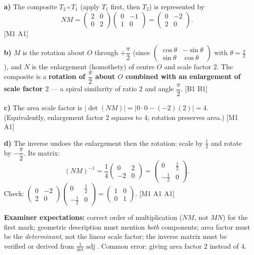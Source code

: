 \documentclass[11pt]{article}
\begin{document}
\begin{corrige}
\textbf{a)} The composite $T_2 \circ T_1$ (apply $T_1$ first, then $T_2$) is represented by
\[ NM = \begin{pmatrix} 2 & 0 \\ 0 & 2 \end{pmatrix}\begin{pmatrix} 0 & -1 \\ 1 & 0 \end{pmatrix} = \begin{pmatrix} 0 & -2 \\ 2 & 0 \end{pmatrix}. \]
\hfill [M1 A1]

\textbf{b)} $M$ is the rotation about $O$ through $+\dfrac{\pi}{2}$ (since $\begin{pmatrix}\cos\theta & -\sin\theta \\ \sin\theta & \cos\theta\end{pmatrix}$ with $\theta = \frac{\pi}{2}$), and $N$ is the enlargement (homothety) of centre $O$ and scale factor $2$. The composite is a \textbf{rotation of $\dfrac{\pi}{2}$ about $O$ combined with an enlargement of scale factor $2$} — a spiral similarity of ratio $2$ and angle $\dfrac{\pi}{2}$. \hfill [B1 B1]

\textbf{c)} The area scale factor is $|\det(NM)| = |0\cdot 0 - (-2)(2)| = 4$. (Equivalently, enlargement factor $2$ squares to $4$; rotation preserves area.) \hfill [M1 A1]

\textbf{d)} The inverse undoes the enlargement then the rotation: scale by $\tfrac12$ and rotate by $-\dfrac{\pi}{2}$. Its matrix:
\[ (NM)^{-1} = \frac{1}{4}\begin{pmatrix} 0 & 2 \\ -2 & 0 \end{pmatrix} = \begin{pmatrix} 0 & \tfrac12 \\[2pt] -\tfrac12 & 0 \end{pmatrix}. \]
Check: $\begin{pmatrix} 0 & -2 \\ 2 & 0 \end{pmatrix}\begin{pmatrix} 0 & \tfrac12 \\ -\tfrac12 & 0 \end{pmatrix} = \begin{pmatrix} 1 & 0 \\ 0 & 1 \end{pmatrix}$. \hfill [M1 A1 A1]

\textbf{Examiner expectations:} correct order of multiplication ($NM$, not $MN$) for the first mark; geometric description must mention \emph{both} components; area factor must be the \emph{determinant}, not the linear scale factor; the inverse matrix must be verified or derived from $\frac{1}{\det}\operatorname{adj}$. Common error: giving area factor $2$ instead of $4$.
\end{corrige}
\end{document}
